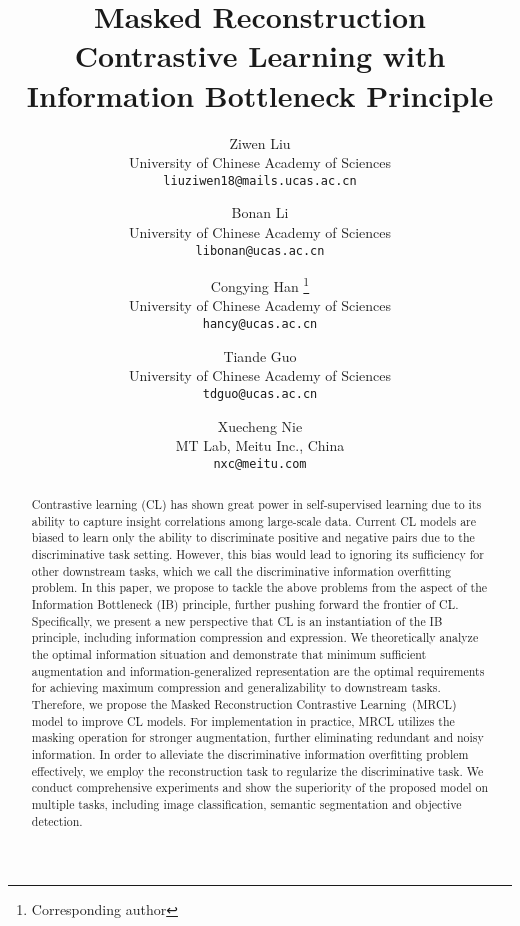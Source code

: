 \documentclass[10pt,twocolumn,letterpaper]{article}
\begin{document}
\title{Masked Reconstruction Contrastive Learning with \\ Information Bottleneck Principle}

\author{Ziwen Liu\\
University of Chinese Academy of Sciences\\
{\tt\small liuziwen18@mails.ucas.ac.cn}
\and
Bonan Li\\
University of Chinese Academy of Sciences\\
{\tt\small libonan@ucas.ac.cn}
\and
Congying Han \thanks{Corresponding author}\\
University of Chinese Academy of Sciences\\
{\tt\small hancy@ucas.ac.cn}
\and
Tiande Guo\\
University of Chinese Academy of Sciences\\
{\tt\small tdguo@ucas.ac.cn}
\and 
Xuecheng Nie\\
MT Lab, Meitu Inc., China\\
{\tt\small nxc@meitu.com}
}

\maketitle

\begin{abstract}
Contrastive learning (CL) has shown great power in self-supervised learning due to its ability to capture insight correlations among large-scale data. Current CL models are biased to learn only the ability to discriminate positive and negative pairs due to the discriminative task setting. However, this bias would lead to ignoring its sufficiency for other downstream tasks, which we call the discriminative information overfitting problem. In this paper, we propose to tackle the above problems from the aspect of the Information Bottleneck (IB) principle, further pushing forward the frontier of CL. Specifically, we present a new perspective that CL is an instantiation of the IB principle, including information compression and expression. We theoretically analyze the optimal information situation and demonstrate that minimum sufficient augmentation and information-generalized representation are the optimal requirements for achieving maximum compression and generalizability to downstream tasks. Therefore, we propose the Masked Reconstruction Contrastive Learning~(MRCL) model to improve CL models. For implementation in practice, MRCL utilizes the masking operation for stronger augmentation, further eliminating redundant and noisy information. In order to alleviate the discriminative information overfitting problem effectively, we employ the reconstruction task to regularize the discriminative task. We conduct comprehensive experiments and show the superiority of the proposed model on multiple tasks, including image classification, semantic segmentation and objective detection.
\end{abstract}
\end{document}
